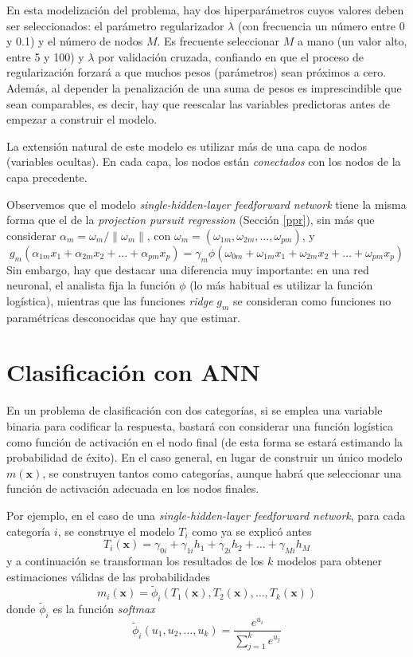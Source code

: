 \documentclass[
]{book}
\theoremstyle{break}
\theoremstyle{definition}
\theoremstyle{definition}
\theoremstyle{definition}
\theoremstyle{definition}
\theoremstyle{remark}
\begin{document}
En esta modelización del problema, hay dos hiperparámetros cuyos valores deben ser seleccionados: el parámetro regularizador \(\lambda\) (con frecuencia un número entre 0 y 0.1) y el número de nodos \(M\). Es frecuente seleccionar \(M\) a mano (un valor alto, entre 5 y 100) y \(\lambda\) por validación cruzada, confiando en que el proceso de regularización forzará a que muchos pesos (parámetros) sean próximos a cero. Además, al depender la penalización de una suma de pesos es imprescindible que sean comparables, es decir, hay que reescalar las variables predictoras antes de empezar a construir el modelo.

La extensión natural de este modelo es utilizar más de una capa de nodos (variables ocultas). En cada capa, los nodos están \emph{conectados} con los nodos de la capa precedente.

Observemos que el modelo \emph{single-hidden-layer feedforward network} tiene la misma forma que el de la \emph{projection pursuit regression} (Sección \ref{ppr}), sin más que considerar \(\alpha_m = \omega_m/\| \omega_m \|\), con \(\omega_m = (\omega_{1m}, \omega_{2m}, \ldots, \omega_{pm})\), y
\[g_m (\alpha_{1m}x_1 + \alpha_{2m}x_2 + \ldots + \alpha_{pm}x_p) = 
\gamma_m \phi(\omega_{0m} + \omega_{1m} x_1 + \omega_{2m} x_2 + \ldots + \omega_{pm} x_p)\]
Sin embargo, hay que destacar una diferencia muy importante: en una red neuronal, el analista fija la función \(\phi\) (lo más habitual es utilizar la función logística), mientras que las funciones \emph{ridge} \(g_m\) se consideran como funciones no paramétricas desconocidas que hay que estimar.

\hypertarget{clasificaciuxf3n-con-ann}{%
\section{Clasificación con ANN}\label{clasificaciuxf3n-con-ann}}

En un problema de clasificación con dos categorías, si se emplea una variable binaria para codificar la respuesta, bastará con considerar una función logística como función de activación en el nodo final (de esta forma se estará estimando la probabilidad de éxito).
En el caso general, en lugar de construir un único modelo \(m(\mathbf{x})\), se construyen tantos como categorías, aunque habrá que seleccionar una función de activación adecuada en los nodos finales.

Por ejemplo, en el caso de una \emph{single-hidden-layer feedforward network}, para cada categoría \(i\), se construye el modelo \(T_i\) como ya se explicó antes
\[T_i(\mathbf{x}) = \gamma_{0i} + \gamma_{1i} h_1 + \gamma_{2i} h_2 + \ldots + \gamma_{Mi} h_M \]
y a continuación se transforman los resultados de los \(k\) modelos para obtener estimaciones válidas de las probabilidades
\[m_i(\mathbf{x}) = \tilde{\phi}_i (T_1(\mathbf{x}), T_2(\mathbf{x}),\ldots, T_k(\mathbf{x})) \]
donde \(\tilde{\phi}_i\) es la función \emph{softmax}
\[\tilde{\phi}_i (u_1,u_2,\ldots,u_k) = \frac{e^{u_i}}{\sum_{j=1}^k e^{u_j}}\]
\end{document}
